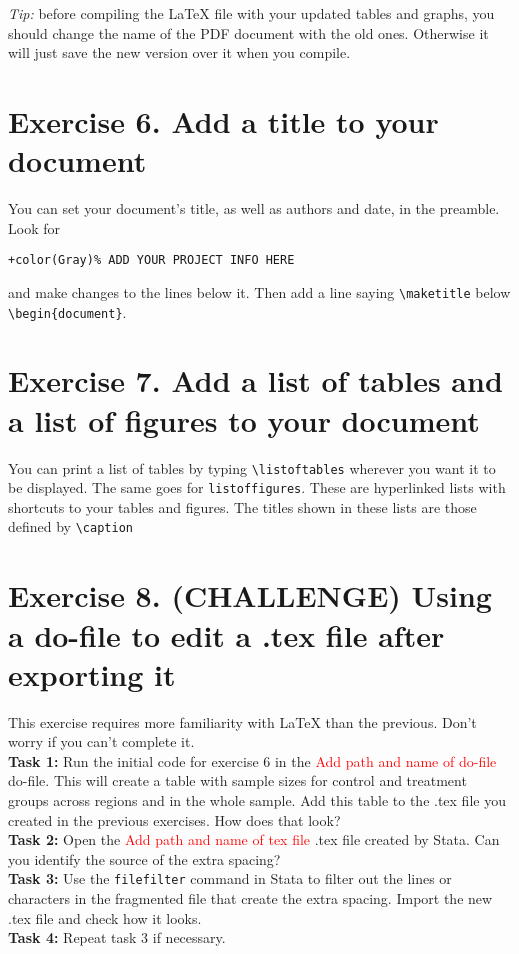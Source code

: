 \documentclass[12pts]{report}
\begin{document}
\begin{center}
	\textcolor{BurntOrange}{\emph{Tip:} before compiling the {\LaTeX} file with your updated tables and graphs, you should change the name of the PDF document with the old ones. Otherwise it will just save the new version over it when you compile.}
\end{center}

\section*{Exercise 6. Add a title to your document}
You can set your document's title, as well as authors and date, in the preamble. Look for
	\begin{center}
	\begin{Verbatim}[commandchars=+\(\)]
		+color(Gray)% ADD YOUR PROJECT INFO HERE 
	\end{Verbatim}
	\end{center}
and make changes to the lines below it. Then add a line saying \verb|\maketitle| below \verb|\begin{document}|.

\section*{Exercise 7. Add a list of tables and a list of figures to your document}
You can print a list of tables by typing \verb|\listoftables| wherever you want it to be displayed. The same goes for \verb|listoffigures|. These are hyperlinked lists with shortcuts to your tables and figures. The titles shown in these lists are those defined by \verb|\caption|

\section*{Exercise 8. (CHALLENGE) Using a do-file to edit a .tex file after exporting it}

This exercise requires more familiarity with {\LaTeX} than the previous. Don't worry if you can't complete it. \\

\textbf{Task 1:} Run the initial code for exercise 6 in the \textcolor{red}{Add path and name of do-file} do-file. This will create a table with sample sizes for control and treatment groups across regions and in the whole sample. Add this table to the .tex file you created in the previous exercises. How does that look?\\

\textbf{Task 2:} Open the \textcolor{red}{Add path and name of tex file} .tex file created by Stata. Can you identify the source of the extra spacing?\\

\textbf{Task 3:} Use the \texttt{filefilter} command in Stata to filter out the lines or characters in the fragmented file that create the extra spacing. Import the new .tex file and check how it looks.\\

\textbf{Task 4:} Repeat task 3 if necessary.
\end{document}
